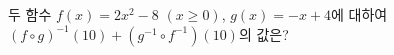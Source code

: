 두 함수 $f(x)=2x^2-8$ $(x\ge 0)$, $g(x)=-x+4$에 대하여 $(f\circ g)^{-1}(10)+(g^{-1}\circ f^{-1})(10)$의 값은?
